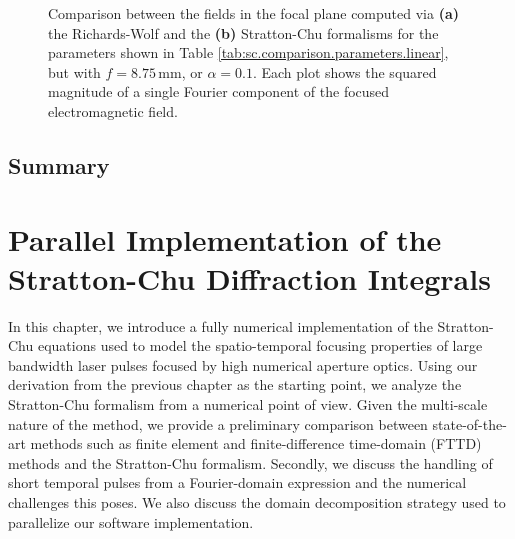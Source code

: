\documentclass[11pt,SymmetricalJury]{inrsthesis/inrsthesis}
\newenvironment{chaptersummary}{%
  \begin{quotation}
  \SingleSpacing
  \setlength{\parskip}{\baselineskip}}{%
  \end{quotation}}
\begin{document}
\begin{figure}
  \caption[Richards-Wolf vs Stratton-Chu: fields in the focal plane, VSF.LIN.G.f0.00875.]
          {Comparison between the fields in the focal plane computed via \textbf{(a)}
          the Richards-Wolf and the \textbf{(b)} Stratton-Chu formalisms for the
          parameters shown in Table \ref{tab:sc.comparison.parameters.linear}, but
          with $f=8.75\,\si{\mm}$, or $\alpha=0.1$. Each plot shows
          the squared magnitude of a single Fourier component of the focused
          electromagnetic field.}
  \label{fig:sc.sc-vs-rw-vsf-lin-g-f0.0875}
\end{figure}


\section{Summary}



\chapter{Parallel Implementation of the Stratton-Chu Diffraction Integrals}
\label{chapter:stratton-chu}


In this chapter, we introduce a fully numerical implementation of the
Stratton-Chu equations used to model the spatio-temporal focusing properties of
large bandwidth laser pulses focused by high numerical aperture optics. Using
our derivation from the previous chapter as the starting point, we analyze the
Stratton-Chu formalism from a numerical point of view. Given the multi-scale
nature of the method, we provide a preliminary comparison between
state-of-the-art methods such as finite element and finite-difference
time-domain (FTTD) methods and the Stratton-Chu formalism. Secondly, we discuss
the handling of short temporal pulses from a Fourier-domain expression and the
numerical challenges this poses. We also discuss the domain decomposition
strategy used to parallelize our software implementation.
\end{document}
